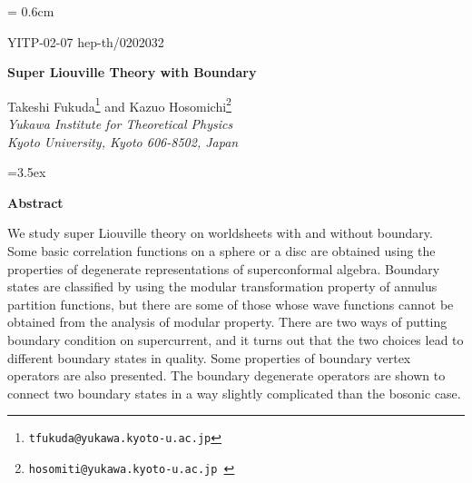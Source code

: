 \documentclass[a4paper,12pt]{article}
\begin{document}
\renewcommand{\thefootnote}{\fnsymbol{footnote}}
\setcounter{footnote}{0}
\setcounter{section}{0}
\baselineskip = 0.6cm
\pagestyle{empty}


\baselineskip 5mm
\hfill\vbox{\hbox{YITP-02-07}
            \hbox{hep-th/0202032} }

\baselineskip0.8cm\vskip2cm

\begin{center}
 {\large\bf Super Liouville Theory with Boundary}
\end{center}

\vskip10mm

\baselineskip0.6cm
\begin{center}
       Takeshi Fukuda\footnote{ \tt tfukuda@yukawa.kyoto-u.ac.jp}
   and Kazuo Hosomichi\footnote{\tt hosomiti@yukawa.kyoto-u.ac.jp }
 \\ \vskip2mm
{\it Yukawa Institute for Theoretical Physics \\
     Kyoto University, Kyoto 606-8502, Japan} \vskip3mm
\end{center}

\vskip8mm\baselineskip=3.5ex
\begin{center}{\bf Abstract}\end{center}\par\smallskip

   We study \coordHE{} super Liouville theory on worldsheets
 with and without boundary.
 Some basic correlation functions on a sphere or a disc
 are obtained using the properties of degenerate representations
 of superconformal algebra.
 Boundary states are classified by using the modular
 transformation property of annulus partition functions,
 but there are some of those whose wave functions
 cannot be obtained from the analysis of modular property.
 There are two ways of putting boundary condition on supercurrent,
 and it turns out that the two choices lead to different
 boundary states in quality.
 Some properties of boundary vertex operators are also presented.
 The boundary degenerate operators are shown to connect two
 boundary states in a way slightly complicated than the bosonic
 case.
\end{document}

